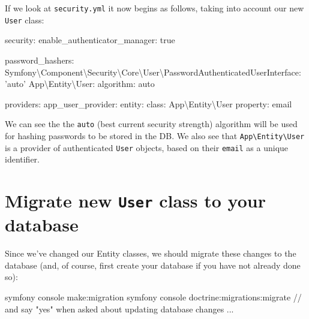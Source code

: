 \documentclass[a4paperpaper,openright]{book}
\newenvironment{Shaded}{}{}
\newcommand{\AttributeTok}[1]{\textcolor[rgb]{0.49,0.56,0.16}{#1}}
\newcommand{\CharTok}[1]{\textcolor[rgb]{0.25,0.44,0.63}{#1}}
\newcommand{\ExtensionTok}[1]{#1}
\newcommand{\FunctionTok}[1]{\textcolor[rgb]{0.02,0.16,0.49}{#1}}
\newcommand{\NormalTok}[1]{#1}
\newcommand{\StringTok}[1]{\textcolor[rgb]{0.25,0.44,0.63}{#1}}
\begin{document}
If we look at \texttt{security.yml} it now begins as follows, taking
into account our new \texttt{User} class:

\begin{Shaded}
\begin{Highlighting}[]
    \FunctionTok{security:}
        \FunctionTok{enable_authenticator_manager:}\AttributeTok{ }\CharTok{true}

        \FunctionTok{password_hashers:}
            \FunctionTok{Symfony\textbackslash{}Component\textbackslash{}Security\textbackslash{}Core\textbackslash{}User\textbackslash{}PasswordAuthenticatedUserInterface:}\AttributeTok{ }\StringTok{'auto'}
            \FunctionTok{App\textbackslash{}Entity\textbackslash{}User:}
                \FunctionTok{algorithm:}\AttributeTok{ auto}

        \FunctionTok{providers:}
            \FunctionTok{app_user_provider:}
                \FunctionTok{entity:}
                    \FunctionTok{class:}\AttributeTok{ App\textbackslash{}Entity\textbackslash{}User}
                    \FunctionTok{property:}\AttributeTok{ email}
\end{Highlighting}
\end{Shaded}

We can see the the \texttt{auto} (best current security strength)
algorithm will be used for hashing passwords to be stored in the DB. We
also see that \texttt{App\textbackslash{}Entity\textbackslash{}User} is
a provider of authenticated \texttt{User} objects, based on their
\texttt{email} as a unique identifier.

\hypertarget{migrate-new-user-class-to-your-database}{%
\section{\texorpdfstring{Migrate new \texttt{User} class to your
database}{Migrate new User class to your database}}\label{migrate-new-user-class-to-your-database}}

Since we've changed our Entity classes, we should migrate these changes
to the database (and, of course, first create your database if you have
not already done so):

\begin{Shaded}
\begin{Highlighting}[]
    \ExtensionTok{symfony}\NormalTok{ console make:migration}
    \ExtensionTok{symfony}\NormalTok{ console doctrine:migrations:migrate // and say }\StringTok{"yes"}\NormalTok{ when asked about updating database changes ...}
\end{Highlighting}
\end{Shaded}
\end{document}
